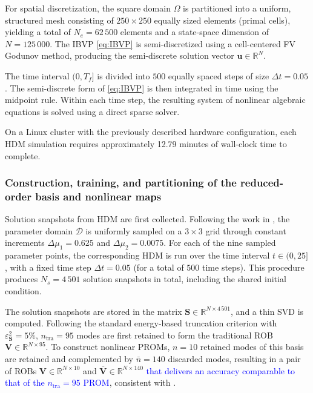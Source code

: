 \documentclass[preprint,10pt]{elsarticle}
\begin{document}
For spatial discretization, the square domain $\Omega$ is partitioned into a uniform, structured mesh consisting of $250 \times 250$ equally sized elements (primal cells), yielding a total of $N_e = 62\,500$ elements and a state-space dimension of $N = 125\,000$. The IBVP \eqref{eq:IBVP} is semi-discretized using a cell-centered FV Godunov method, 
producing the semi-discrete solution vector $\mathbf{u} \in \mathbb{R}^{N}$.

The time interval $(0, T_f]$ is divided into $500$ equally spaced steps of size $\Delta t = 0.05$. The semi-discrete form of \eqref{eq:IBVP} is then integrated in time using the midpoint rule. Within each time step, the resulting system of nonlinear algebraic equations is solved using a direct sparse solver. 

On a Linux cluster with the previously described hardware configuration, each HDM simulation requires approximately 12.79 minutes of wall-clock time to complete. 

\subsubsection{Construction, training, and partitioning of the reduced-order basis and nonlinear maps}
\label{sec:rom-basis-construction}

Solution snapshots from HDM are first collected. Following the work in \cite{barnett2023neural}, the parameter domain $\mathcal D$ is uniformly sampled on a $3 \times 3$ grid through constant increments $\Delta \mu_1 = 0.625$ and $\Delta \mu_2 = 0.0075$. For each of the nine sampled parameter points, the corresponding HDM is run over the time interval $t \in (0, 25]$, with a fixed time step $\Delta t = 0.05$ (for a total of $500$ time steps). This procedure produces $N_s = 4\,501$ solution snapshots in total, including the shared initial condition.

The solution snapshots are stored in the matrix $\mathbf{S} \in \mathbb{R}^{N \times 4\,501}$, and a thin SVD is computed. Following the standard energy-based truncation criterion with $\varepsilon^2_{\mathbf{S}} = 5\%$, $n_{\text{tra}} = 95$ modes are first retained to form the traditional ROB $\mathbf{V} \in \mathbb{R}^{N \times 95}$. To construct nonlinear PROMs, $n = 10$ retained modes of this basis are retained and complemented by $\bar{n}=140$ discarded modes, resulting in a pair of ROBs $\mathbf{V} \in \mathbb{R}^{N \times 10}$ and $\mathbf{\overline {V}} \in \mathbb{R}^{N \times 140}$ \textcolor{blue}{that delivers an accuracy comparable to that of the $n_{\text{tra}}=95$ PROM}, consistent with \cite{barnett2023neural}.
\end{document}
